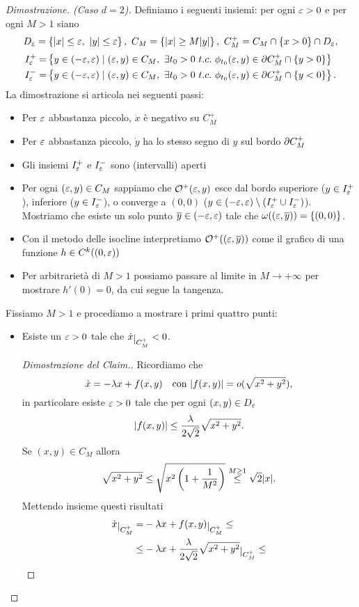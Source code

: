 \begin{proof}[Dimostrazione. (Caso $d=2$)]
\noindent Definiamo i seguenti insiemi: per ogni $\varepsilon>0$ e per ogni $M>1$ siano
\[D_\e=\cpa{|x|\leq\e,\ |y|\leq \e},\ C_M=\cpa{|x|\geq M|y|},\ C_M^+=C_M\cap\cpa{x>0}\cap D_\e,\]
\begin{align*}
I^+_\e=&\cpa{y\in(-\e,\e)\mid (\e,y)\in C_M,\ \exists t_0>0\ t.c.\ \phi_{t_0}(\e,y)\in \del C_M^+\cap \cpa{y>0}}\\
I^-_\e=&\cpa{y\in(-\e,\e)\mid (\e,y)\in C_M,\ \exists t_0>0\ t.c.\ \phi_{t_0}(\e,y)\in \del C_M^+\cap \cpa{y<0}}.
\end{align*}
La dimostrazione si articola nei seguenti passi:
\begin{itemize}
\item Per $\varepsilon$ abbastanza piccolo, $\dot x$ \`e negativo su $C^+_M$
\item Per $\varepsilon$ abbastanza piccolo, $\dot y$ ha lo stesso segno di $y$ sul bordo $\partial C^+_M$
\item Gli insiemi $I^+_\varepsilon$ e $I^-_\varepsilon$ sono (intervalli) aperti
\item Per ogni $(\varepsilon,y)\in C_M$ sappiamo che $\mathcal{O}^+(\varepsilon,y)$ esce dal bordo superiore ($y\in I^+_\varepsilon$), inferiore ($y\in I^-_\varepsilon$), o converge a $(0,0)$ ($y\in (-\varepsilon,\varepsilon)\setminus(I^+_\varepsilon\cup I^-_\varepsilon)$).\\
Mostriamo che esiste un solo punto $\overline{y}\in (-\varepsilon,\varepsilon)$ tale che $\omega((\varepsilon,\overline{y}))=\left\{{(0,0)}\right\}$.
\item Con il metodo delle isocline interpretiamo $\mathcal{O}^+((\varepsilon,\overline{y}))$ come il grafico di una funzione $h\in C^k((0,\varepsilon))$
\item Per arbitrariet\`a di $M>1$ possiamo passare al limite in $M\to+\infty$ per mostrare $h'(0)=0$, da cui segue la tangenza.
\end{itemize}
Fissiamo $M>1$ e procediamo a mostrare i primi quattro punti:
\begin{itemize}
\item[\ul{Claim}:] Esiste un $\varepsilon>0$ tale che $\dot x\res{C_M^+}<0$.
\begin{proof}[Dimostrazione del Claim.]
Ricordiamo che
\[\dot x=-\lambda x+f(x,y)\quad\text{con }|f(x,y)|=o(\sqrt{x^2+y^2}),\]
in particolare esiste $\varepsilon>0$ tale che per ogni $(x,y)\in D_\varepsilon$
\[\left|{f(x,y)}\right|\leq \frac{\lambda}{2\sqrt 2}\sqrt{x^2+y^2}.\]
Se $(x,y)\in C_M$ allora
\[\sqrt{x^2+y^2}\leq \sqrt{x^2\left({1+\frac1{M^2}}\right)}\overset{M\geq 1}{\leq} \sqrt 2|x|.\]
Mettendo insieme questi risultati
\begin{align*}
\dot x\res{C_M^+}=&-\la x+f(x,y)\res{C_M^+}\leq\\
\leq& -\la x+\frac\la{2\sqrt 2}\sqrt{x^2+y^2}\res{C_M^+}\leq\\

\end{align*}
\end{proof}
\end{itemize}
\end{proof}

